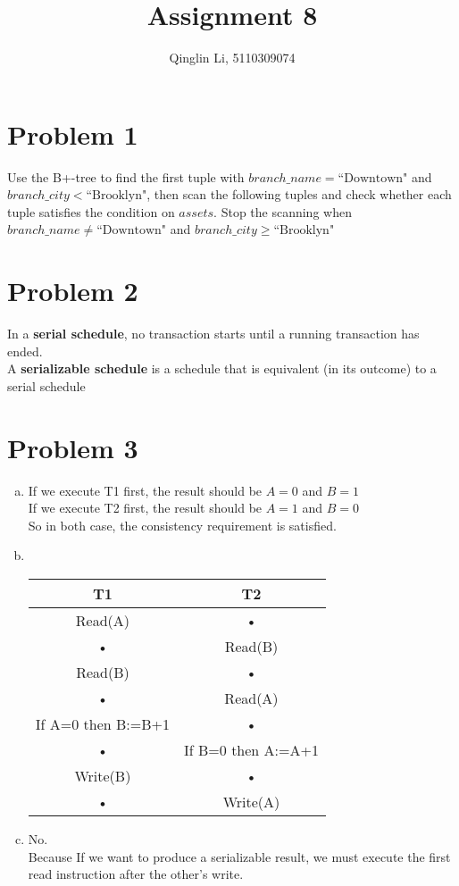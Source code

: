 \documentclass[a4paper,11pt]{article}
\begin{document}
\pagestyle{fancy}
\rfoot{\thepage}
\setlength{\parskip}{0.7ex plus0.2ex minus0.2ex}
\cfoot{\empty}
\lhead{\empty}


\title{Assignment 8}
\author{Qinglin Li, 5110309074}
\date{}
\maketitle

\headheight 3pt
\thispagestyle{fancy}
\section*{Problem 1}
Use the B+-tree to find the first tuple with $branch\_name = \text{``Downtown"}$ and $branch\_city < \text{``Brooklyn"}$, then scan the following tuples and check whether each tuple satisfies the condition on $assets$. Stop the scanning when $branch\_name \neq \text{``Downtown"}$ and $branch\_city \geq \text{``Brooklyn"}$

\section*{Problem 2}
In a \textbf{serial schedule}, no transaction starts until a running transaction has ended.\\
A \textbf{serializable schedule} is a schedule that is equivalent (in its outcome) to a serial schedule

\section*{Problem 3}
\begin{enumerate}[a.]
\item
If we execute T1 first, the result should be $A=0$ and $B=1$\\
If we execute T2 first, the result should be $A=1$ and $B=0$\\
So in both case, the consistency requirement is satisfied.
\item ~\\
\begin{tabular}{|c|c|}
\hline 
T1 & T2 \\ 
\hline 
Read(A) & • \\ 
\hline 
• & Read(B) \\ 
\hline 
Read(B) & • \\ 
\hline 
• & Read(A) \\ 
\hline 
If A=0 then B:=B+1 & • \\ 
\hline 
• & If B=0 then A:=A+1 \\ 
\hline 
Write(B) & • \\ 
\hline 
• & Write(A) \\ 
\hline 
\end{tabular} 
\item 
No.\\
Because If we want to produce a serializable result, we must execute the first read instruction after the other's write.

\end{enumerate}
\end{document}
